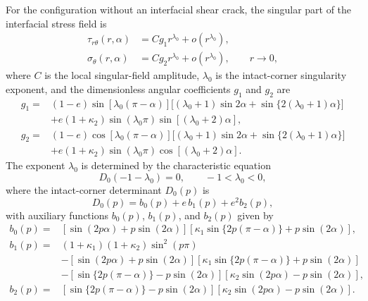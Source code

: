 For the configuration without an interfacial shear crack, the singular
part of the interfacial stress field is~\cite{NazarenkoKipnis2022Stress}
\begin{equation}
\label{eq:app-intact-field}
\begin{aligned}
  \tau_{r\theta}(r,\alpha)
    &=Cg_1r^{\lambda_0}+o\!\left(r^{\lambda_0}\right),\\
  \sigma_\theta(r,\alpha)
    &=Cg_2r^{\lambda_0}+o\!\left(r^{\lambda_0}\right),
    \qquad r\to0,
\end{aligned}
\end{equation}
where $C$ is the local singular-field amplitude, $\lambda_0$ is
the intact-corner singularity exponent, and the dimensionless angular
coefficients $g_1$ and $g_2$ are
\begin{equation*}
\begin{aligned}
  g_1={}&(1-e)\sin[\lambda_0(\pi-\alpha)]
  \bigl[(\lambda_0+1)\sin2\alpha
       +\sin\{2(\lambda_0+1)\alpha\}\bigr]\\
  &+e(1+\kappa_2)\sin(\lambda_0\pi)
      \sin[(\lambda_0+2)\alpha],\\[2pt]
  g_2={}&(1-e)\cos[\lambda_0(\pi-\alpha)]
  \bigl[(\lambda_0+1)\sin2\alpha
       +\sin\{2(\lambda_0+1)\alpha\}\bigr]\\
  &+e(1+\kappa_2)\sin(\lambda_0\pi)
      \cos[(\lambda_0+2)\alpha].
\end{aligned}
\end{equation*}
The exponent $\lambda_0$ is determined by the characteristic equation
\begin{equation}
\label{eq:app-D0-root}
  D_0(-1-\lambda_0)=0,
  \qquad -1<\lambda_0<0,
\end{equation}
where the intact-corner determinant $D_0(p)$ is
\begin{equation*}
  D_0(p)=b_0(p)+e\,b_1(p)+e^2b_2(p),
\end{equation*}
with auxiliary functions $b_0(p)$, $b_1(p)$, and $b_2(p)$ given by
\begin{equation*}
\begin{aligned}
  b_0(p)={}&
  [\sin(2p\alpha)+p\sin(2\alpha)]
  [\kappa_1\sin\{2p(\pi-\alpha)\}+p\sin(2\alpha)],\\[2pt]
  b_1(p)={}&(1+\kappa_1)(1+\kappa_2)\sin^2(p\pi)\\
  &-[\sin(2p\alpha)+p\sin(2\alpha)]
    [\kappa_1\sin\{2p(\pi-\alpha)\}+p\sin(2\alpha)]\\
  &-[\sin\{2p(\pi-\alpha)\}-p\sin(2\alpha)]
    [\kappa_2\sin(2p\alpha)-p\sin(2\alpha)],\\[2pt]
  b_2(p)={}&
  [\sin\{2p(\pi-\alpha)\}-p\sin(2\alpha)]
  [\kappa_2\sin(2p\alpha)-p\sin(2\alpha)].
\end{aligned}
\end{equation*}
